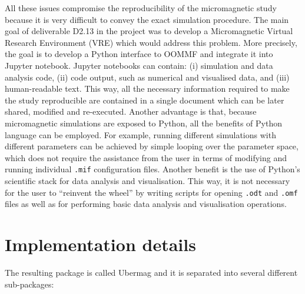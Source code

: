 \documentclass{deliverablereport}
\begin{document}
All these issues compromise the reproducibility of the micromagnetic study because it is very difficult to convey the exact simulation procedure. The main goal of deliverable D2.13 in the \ODK project was to develop a Micromagnetic Virtual Research Environment (VRE) which would address this problem. More precisely, the goal is to develop a Python interface to OOMMF and integrate it into Jupyter notebook. Jupyter notebooks can contain: (i) simulation and data analysis code, (ii) code output, such as numerical and visualised data, and (iii) human-readable text. This way, all the necessary information required to make the study reproducible are contained in a single document which can be later shared, modified and re-executed. Another advantage is that, because micromagnetic simulations are exposed to Python, all the benefits of Python language can be employed. For example, running different simulations with different parameters can be achieved by simple looping over the parameter space, which does not require the assistance from the user in terms of modifying and running individual \texttt{.mif} configuration files. Another benefit is the use of Python's scientific stack for data analysis and visualisation. This way, it is not necessary for the user to ``reinvent the wheel'' by writing scripts for opening \texttt{.odt} and \texttt{.omf} files as well as for performing basic data analysis and visualisation operations.   

\section{Implementation details}

The resulting package is called Ubermag and it is separated into several different sub-packages:
\end{document}
